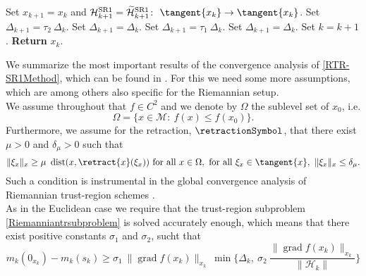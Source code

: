 \begin{algorithm}[H]
\begin{algorithmic}[1]
			\Else 
				\State Set $x_{k+1} = x_k$ and $\mathcal{H}^\mathrm{SR1}_{k+1} = \widetilde{\mathcal{H}}^\mathrm{SR1}_{k+1} \colon \ \tangent{x_{k}} \to \tangent{x_{k}}$.
            \EndIf 
                    \State Set $\Delta_{k+1} = \tau_2 \ \Delta_k$.
                \Else 
                    \State Set $\Delta_{k+1} = \Delta_k$.
                \EndIf 
			\Else 
                    \State Set $\Delta_{k+1} = \tau_1 \ \Delta_k$.
                \Else 
                    \State Set $\Delta_{k+1} = \Delta_k$.
                \EndIf 
            \EndIf 
            \State Set $k = k+1$.
        \EndWhile
        \State \textbf{Return} $x_k$.
    \end{algorithmic}
\end{algorithm}
We summarize the most important results of the convergence analysis of \cref{RTR-SR1Method}, which can be found in \cite{HuangAbsilGallivan:2014}. For this we need some more assumptions, which are among others also specific for the Riemannian setup. \\
We assume throughout that $f \in C^2$ and we denote by $\Omega$ the sublevel set of $x_0$, i.e.
\begin{equation*}
    \Omega = \{ x \in \mathcal{M} \colon \ f(x) \leq f(x_0) \}.
\end{equation*}
Furthermore, we assume for the retraction, $\retractionSymbol$, that there exist $\mu > 0$ and $\delta_{\mu} > 0$ such that
\begin{equation}\label{RetractionAssumption}
    \lVert \xi_x \rVert_x \geq \mu \ \operatorname{dist}(x, \retract{x}(\xi_x)) \text{ for all } x \in \Omega, \text{ for all } \xi_x \in \tangent{x}, \ \lVert \xi_x \rVert_x \leq \delta_{\mu}.
\end{equation}
Such a condition is instrumental in the global convergence analysis of Riemannian trust-region schemes \cite[p.~7]{HuangAbsilGallivan:2014}. \\
As in the Euclidean case we require that the trust-region subproblem \cref{Riemanniantrsubproblem} is solved accurately enough, which means that there exist positive constants $\sigma_1$ and $\sigma_2$, sucht that 
\begin{equation}\label{RiemannianAccuracy1}
    m_k(0_{x_k}) - m_k(s_k) \geq \sigma_1 \ \lVert \operatorname{grad} f(x_k) \rVert_{x_k} \ \min \Bigg \{ \Delta_k, \ \sigma_2 \ \frac{\lVert \operatorname{grad} f(x_k) \rVert_{x_k}}{\lVert \mathcal{H}_k \rVert} \Bigg \}
\end{equation} 
